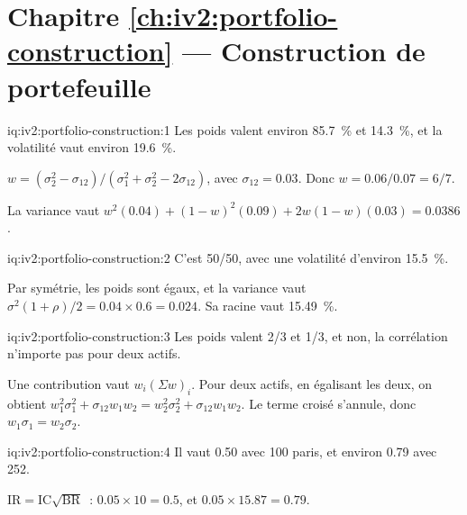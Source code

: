\section*{Chapitre \ref{ch:iv2:portfolio-construction} --- Construction de portefeuille}

\begin{solution}{iq:iv2:portfolio-construction:1}
Les poids valent environ 85.7~\% et 14.3~\%, et la volatilité vaut environ 19.6~\%.

$w = (\sigma_2^2 - \sigma_{12})/(\sigma_1^2 + \sigma_2^2 - 2\sigma_{12})$, avec $\sigma_{12} = 0.03$. Donc $w = 0.06/0.07 = 6/7$.

La variance vaut $w^2(0.04) + (1 - w)^2(0.09) + 2w(1 - w)(0.03) = 0.0386$.

\end{solution}

\begin{solution}{iq:iv2:portfolio-construction:2}
C'est 50/50, avec une volatilité d'environ 15.5~\%.

Par symétrie, les poids sont égaux, et la variance vaut $\sigma^2(1 + \rho)/2 = 0.04 \times 0.6 = 0.024$. Sa racine vaut 15.49~\%.

\end{solution}

\begin{solution}{iq:iv2:portfolio-construction:3}
Les poids valent 2/3 et 1/3, et non, la corrélation n'importe pas pour deux actifs.

Une contribution vaut $w_i(\Sigma w)_i$. Pour deux actifs, en égalisant les deux, on obtient $w_1^2\sigma_1^2 + \sigma_{12}w_1w_2 = w_2^2\sigma_2^2 + \sigma_{12}w_1w_2$. Le terme croisé s'annule, donc $w_1\sigma_1 = w_2\sigma_2$.

\end{solution}

\begin{solution}{iq:iv2:portfolio-construction:4}
Il vaut 0.50 avec 100 paris, et environ 0.79 avec 252.

$\mathrm{IR} = \mathrm{IC}\sqrt{\mathrm{BR}}$~: $0.05 \times 10 = 0.5$, et $0.05 \times 15.87 = 0.79$.

\end{solution}

